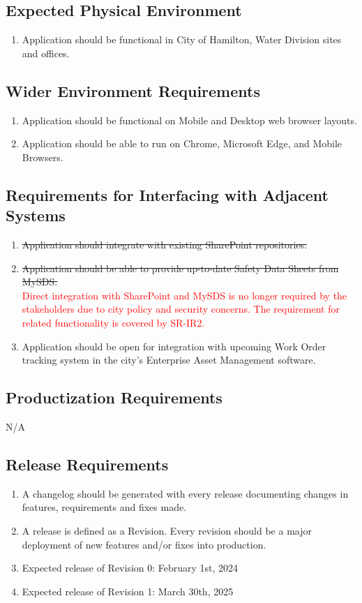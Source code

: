 \documentclass[12pt]{article}
\begin{document}
\subsection{Expected Physical Environment}
\begin{enumerate} [{OE-PE}1.]
  \item Application should be functional in City of Hamilton, Water
    Division sites and offices.
\end{enumerate}
\subsection{Wider Environment Requirements}
\begin{enumerate} [{OE-WE}1.]
  \item Application should be functional on Mobile and Desktop web
    browser layouts.
  \item Application should be able to run on Chrome, Microsoft Edge,
    and Mobile Browsers.
\end{enumerate}
\subsection{Requirements for Interfacing with Adjacent Systems}
\begin{enumerate} [{OE-IAS}1.]
  \item \sout{Application should integrate with existing SharePoint
    repositories.}
  \item \sout{Application should be able to provide up-to-date Safety Data
    Sheets from MySDS.}\\
    \textcolor{red}{Direct integration with SharePoint and MySDS is
      no longer required by the stakeholders due to city policy and
      security concerns. The requirement for related functionality is
    covered by SR-IR2.}
  \item Application should be open for integration with upcoming Work
    Order tracking system in the city's Enterprise Asset Management software.
\end{enumerate}
\subsection{Productization Requirements}
N/A
\subsection{Release Requirements}
\begin{enumerate} [{OE-REL}1.]
  \item A changelog should be generated with every release
    documenting changes in features, requirements and fixes made.
  \item A release is defined as a Revision. Every revision should be
    a major deployment of new features and/or fixes into production.
  \item Expected release of Revision 0: February 1st, 2024
  \item Expected release of Revision 1: March 30th, 2025
\end{enumerate}
\end{document}
